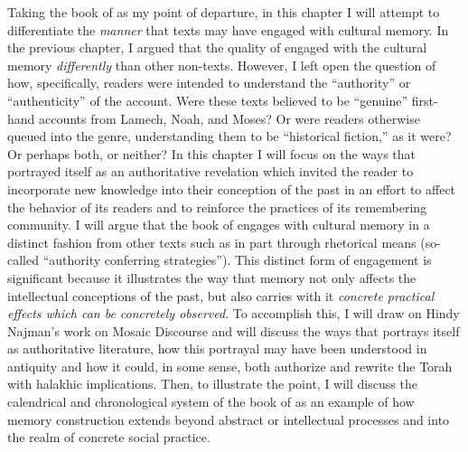 Taking the book of \jub as my point of departure, in this chapter I will attempt to differentiate the \emph{manner} that \rwb texts may have engaged with cultural memory. In the previous chapter, I argued that the \psgraphical quality of \ga engaged with the cultural memory \emph{differently} than other non-\psgraphical texts. However, I left open the question of how, specifically, readers were intended to understand the ``authority'' or ``authenticity'' of the account. Were these \psgraphical texts believed to be ``genuine'' first-hand accounts from Lamech, Noah, and Moses? Or were readers otherwise queued into the genre, understanding them to be ``historical fiction,'' as it were? Or perhaps both, or neither? In this chapter I will focus on the ways that \jub portrayed itself as an authoritative revelation which invited the reader to incorporate new knowledge into their conception of the past in an effort to affect the behavior of its readers and to reinforce the practices of its remembering community. I will argue that the book of \jub engages with cultural memory in a distinct fashion from other texts such as \ga in part through rhetorical means (so-called ``authority conferring strategies''). This distinct form of engagement is significant because it illustrates the way that memory not only affects the intellectual conceptions of the past, but also carries with it \emph{concrete practical effects which can be concretely observed}. To accomplish this, I will draw on Hindy Najman's work on Mosaic Discourse and will discuss the ways that \jub portrays itself as authoritative literature, how this portrayal may have been understood in antiquity and how it could, in some sense, both authorize and rewrite the Torah with halakhic implications. Then, to illustrate the point, I will discuss the calendrical and chronological system of the book of \jub as an example of how memory construction extends beyond abstract or intellectual processes and into the realm of concrete social practice.


